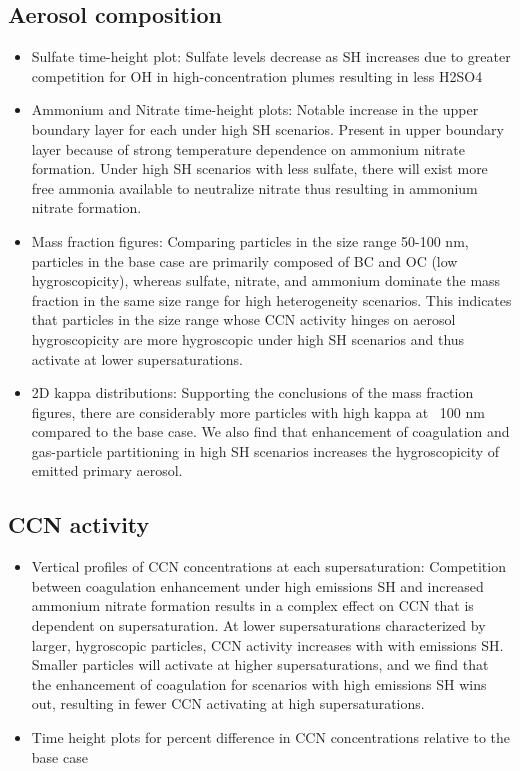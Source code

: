 \documentclass[journal abbreviation, manuscript]{copernicus}
\begin{document}
\subsection{Aerosol composition}
\begin{itemize}
\item Sulfate time-height plot: Sulfate levels decrease as SH increases due to greater competition for OH in high-concentration plumes resulting in less H2SO4
\item Ammonium and Nitrate time-height plots: Notable increase in the upper boundary layer for each under high SH scenarios. Present in upper boundary layer because of strong temperature dependence on ammonium nitrate formation. Under high SH scenarios with less sulfate, there will exist more free ammonia available to neutralize nitrate thus resulting in ammonium nitrate formation.
\item Mass fraction figures: Comparing particles in the size range 50-100 nm, particles in the base case are primarily composed of BC and OC (low hygroscopicity), whereas sulfate, nitrate, and ammonium dominate the mass fraction in the same size range for high heterogeneity scenarios. This indicates that particles in the size range whose CCN activity hinges on aerosol hygroscopicity are more hygroscopic under high SH scenarios and thus activate at lower supersaturations.
\item 2D kappa distributions: Supporting the conclusions of the mass fraction figures, there are considerably more particles with high kappa at ~100 nm compared to the base case. We also find that enhancement of coagulation and gas-particle partitioning in high SH scenarios increases the hygroscopicity of emitted primary aerosol. 
\end{itemize}

\subsection{CCN activity}
\begin{itemize}
\item Vertical profiles of CCN concentrations at each supersaturation: Competition between coagulation enhancement under high emissions SH and increased ammonium nitrate formation results in a complex effect on CCN that is dependent on supersaturation. At lower supersaturations characterized by larger, hygroscopic particles, CCN activity increases with with emissions SH. Smaller particles will activate at higher supersaturations, and we find that the enhancement of coagulation for scenarios with high emissions SH wins out, resulting in fewer CCN activating at high supersaturations.
\item Time height plots for percent difference in CCN concentrations relative to the base case
\end{itemize}
\end{document}
